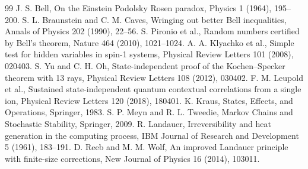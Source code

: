 \documentclass[11pt,a4paper]{article}
\begin{document}
\begin{thebibliography}{99}
 J. S. Bell, On the Einstein Podolsky Rosen paradox, Physics 1 (1964), 195--200.
 S. L. Braunstein and C. M. Caves, Wringing out better Bell inequalities, Annals of Physics 202 (1990), 22--56.
 S. Pironio et al., Random numbers certified by Bell's theorem, Nature 464 (2010), 1021--1024.
 A. A. Klyachko et al., Simple test for hidden variables in spin-1 systems, Physical Review Letters 101 (2008), 020403.
 S. Yu and C. H. Oh, State-independent proof of the Kochen--Specker theorem with 13 rays, Physical Review Letters 108 (2012), 030402.
 F. M. Leupold et al., Sustained state-independent quantum contextual correlations from a single ion, Physical Review Letters 120 (2018), 180401.
 K. Kraus, States, Effects, and Operations, Springer, 1983.
 S. P. Meyn and R. L. Tweedie, Markov Chains and Stochastic Stability, Springer, 2009.
 R. Landauer, Irreversibility and heat generation in the computing process, IBM Journal of Research and Development 5 (1961), 183--191.
 D. Reeb and M. M. Wolf, An improved Landauer principle with finite-size corrections, New Journal of Physics 16 (2014), 103011.
\end{thebibliography}
\end{document}
